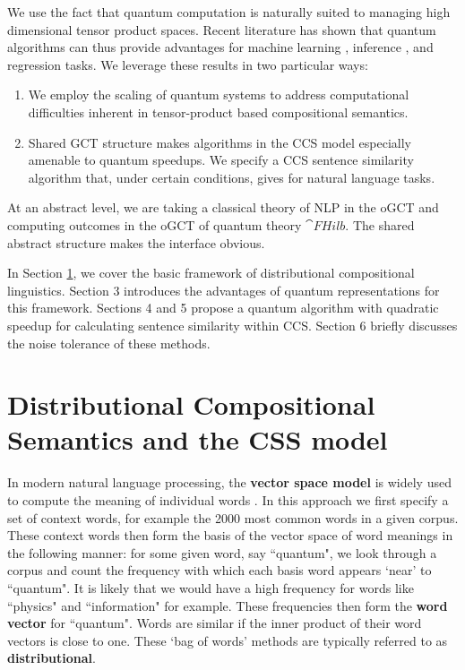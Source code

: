 We use the fact that quantum computation is naturally suited to managing high dimensional tensor product spaces. Recent literature has shown that quantum algorithms can thus provide advantages for machine learning \cite{wiebe2014quantum,rebentrost2014quantum}, inference \cite{low2014quantum}, and regression \cite{wiebe2012quantum,wang2014quantum} tasks.  We leverage these results in two particular ways:
\begin{enumerate}
\item We employ the scaling of quantum systems to address computational difficulties  inherent in tensor-product based compositional semantics.
\item Shared GCT structure makes algorithms in the CCS model especially amenable to quantum speedups.  We specify a CCS sentence similarity algorithm that, under certain conditions, gives  for natural language tasks.
\end{enumerate}
At an abstract level, we are taking a classical theory of NLP in the oGCT  and computing outcomes in the oGCT of quantum theory $\cat{FHilb}$. The shared abstract structure makes the interface obvious.

In Section \ref{sec:disco}, we cover the basic framework of distributional compositional linguistics. Section 3 introduces the advantages of quantum representations for this framework.  Sections 4 and 5 propose a quantum algorithm with quadratic speedup for calculating sentence similarity within CCS. Section 6 briefly discusses the noise tolerance of these methods.

\section{Distributional Compositional Semantics and the CSS model}
\label{sec:disco}
In modern natural language processing, the \textbf{vector space model} is widely used to compute the meaning of individual words \cite{schutze1998automatic}. In this approach we first specify a set of context words, for example the 2000 most common words in a given corpus.  These context words then form the basis of the vector space of word meanings in the following manner: for some given word, say  ``quantum", we look through a corpus and count the frequency with which each basis word    appears `near' to ``quantum". It is likely that we would have a high frequency for words like ``physics" and ``information" for example.  These frequencies then form the \textbf{word vector} for ``quantum". Words are similar if the inner product of their word vectors is close to one. These `bag of words' methods are typically referred to as \textbf{distributional}.

